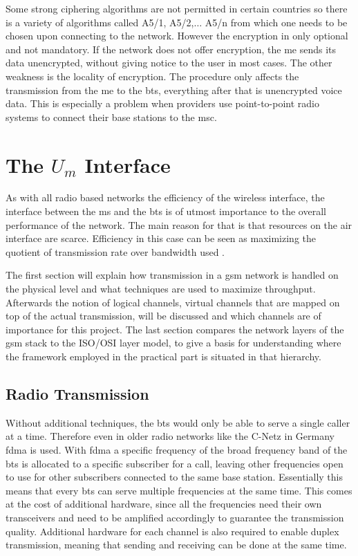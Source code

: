 Some strong ciphering algorithms are not permitted in certain countries so there is a variety of algorithms called A5/1, A5/2,$\ldots$ A5/n from which one needs to be chosen upon connecting to the network.
However the encryption in only optional and not mandatory.
If the network does not offer encryption, the \gls{me} sends its data unencrypted, without giving notice to the user in most cases.
The other weakness is the locality of encryption.
The procedure only affects the transmission from the \gls{me} to the \gls{bts}, everything after that is unencrypted voice data.
This is especially a problem when providers use point-to-point radio systems to connect their base stations to the \gls{msc}.

\section{The $U_m$ Interface}
\label{sec:Um}
As with all radio based networks the efficiency of the wireless interface, the interface between the \gls{ms} and the \gls{bts} is of utmost importance to the overall performance of the network.
The main reason for that is that resources on the air interface are scarce.
Efficiency in this case can be seen as maximizing the quotient of transmission rate over bandwidth used \cite{protocols1999}.

The first section will explain how transmission in a \gls{gsm} network is handled on the physical level and what techniques are used to maximize throughput.
Afterwards the notion of logical channels, virtual channels that are mapped on top of the actual transmission, will be discussed and which channels are of importance for this project.
The last section compares the network layers of the \gls{gsm} stack to the ISO/OSI layer model, to give a basis for understanding where the framework employed in the practical part is situated in that hierarchy.

\subsection{Radio Transmission}
\label{sec:radio}
Without additional techniques, the \gls{bts} would only be able to serve a single caller at a time. 
Therefore even in older radio networks like the C-Netz in Germany \gls{fdma} is used.
With \gls{fdma} a specific frequency of the broad frequency band of the \gls{bts} is allocated to a specific subscriber for a call, leaving other frequencies open to use for other subscribers connected to the same base station.
Essentially this means that every \gls{bts} can serve multiple frequencies at the same time.
This comes at the cost of additional hardware, since all the frequencies need their own transceivers and need to be amplified accordingly to guarantee the transmission quality.
Additional hardware for each channel is also required to enable duplex transmission, meaning that sending and receiving can be done at the same time.

